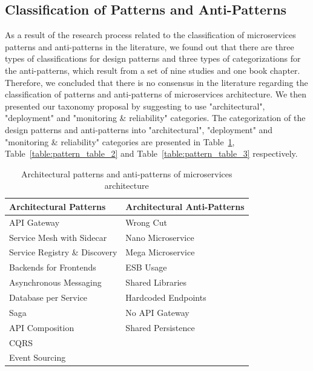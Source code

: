 \documentclass[11pt,a4paper,twocolumn]{article}
\begin{document}
\subsection{Classification of Patterns and Anti-Patterns}
\label{subsec:rq1}

As a result of the research process related to the classification of microservices patterns and anti-patterns in the literature, we found out that there are three types of classifications for design patterns and three types of categorizations for the anti-patterns, which result from a set of nine studies and one book chapter. 
Therefore, we concluded that there is no consensus in the literature regarding the classification of patterns and anti-patterns of microservices architecture.
We then presented our taxonomy proposal by suggesting to use "architectural", "deployment" and "monitoring \& reliability" categories.
The categorization of the design patterns and anti-patterns into "architectural", "deployment" and "monitoring \& reliability" categories are presented in Table~\ref{table:pattern_table_1}, Table~\ref{table:pattern_table_2} and Table~\ref{table:pattern_table_3} respectively.

\begin{table}[H]
\centering 
    \begin{tabular}{ 
  | >{\centering\arraybackslash} m{9em} 
  | >{\centering\arraybackslash} m{9em} | }
    \hline
    \rowcolor{bluepoli!40}
    \textbf{Architectural Patterns} & \textbf{Architectural Anti-Patterns}\T\B \\
    \hline \hline
    API Gateway & Wrong Cut\T\B\\
    \hline
    \rowcolor{bluepoli!10}
    Service Mesh with Sidecar & Nano Microservice\T\B\\
    \hline
    Service Registry \& Discovery & Mega Microservice\T\B\\
    \hline
    \rowcolor{bluepoli!10}
    Backends for Frontends & ESB Usage\T\B\\
    \hline
    Asynchronous Messaging & Shared Libraries\T\B\\
    \hline
    \rowcolor{bluepoli!10}
    Database per Service & Hardcoded Endpoints \T\B\\
    \hline
    Saga & No API Gateway \T\B\\
    \hline
    \rowcolor{bluepoli!10}
    API Composition & Shared Persistence \T\B\\
    \hline
    CQRS & \T\B\\
    \hline
    \rowcolor{bluepoli!10}
    Event Sourcing & \T\B\\
    \hline
    \end{tabular}
    \\[10pt]
    \caption{Architectural patterns and anti-patterns of microservices architecture}
    \label{table:pattern_table_1}
\end{table}
\end{document}
